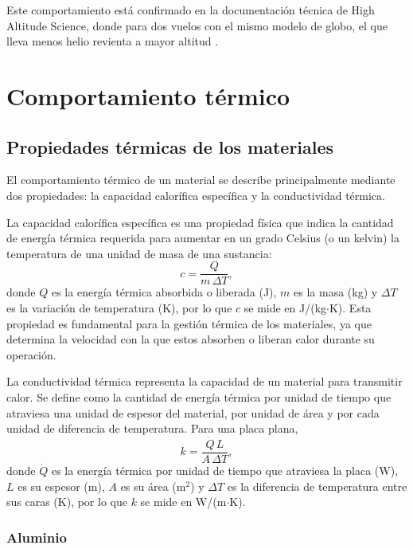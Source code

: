 \documentclass[12pt,a4paper]{article}
\begin{document}
Este comportamiento está confirmado en la documentación técnica de High Altitude Science, donde para dos vuelos con el mismo modelo de globo, el que lleva menos helio revienta a mayor altitud \cite{ref74}.

\newpage

\section{Comportamiento térmico}\label{materiales-termico}

\subsection{Propiedades térmicas de los materiales}\label{materiales}

El comportamiento térmico de un material se describe principalmente mediante dos propiedades: la capacidad calorífica específica y la conductividad térmica.

La capacidad calorífica específica es una propiedad física que indica la cantidad de energía térmica requerida para aumentar en un grado Celsius (o un kelvin) la temperatura de una unidad de masa de una sustancia:
\begin{equation}
  c = \frac{Q}{m \, \Delta T},
  \label{eq:calor-especifico}
\end{equation}
donde $Q$ es la energía térmica absorbida o liberada (J), $m$ es la masa (kg) y $\Delta T$ es la variación de temperatura (K), por lo que $c$ se mide en J/(kg$\cdot$K). Esta propiedad es fundamental para la gestión térmica de los materiales, ya que determina la velocidad con la que estos absorben o liberan calor durante su operación.

La conductividad térmica representa la capacidad de un material para transmitir calor. Se define como la cantidad de energía térmica por unidad de tiempo que atraviesa una unidad de espesor del material, por unidad de área y por cada unidad de diferencia de temperatura. Para una placa plana,
\begin{equation}
  k = \frac{\dot{Q} \, L}{A \, \Delta T},
  \label{eq:conductividad}
\end{equation}
donde $\dot{Q}$ es la energía térmica por unidad de tiempo que atraviesa la placa (W), $L$ es su espesor (m), $A$ es su área (m$^2$) y $\Delta T$ es la diferencia de temperatura entre sus caras (K), por lo que $k$ se mide en W/(m$\cdot$K).

\subsubsection{Aluminio}\label{aluminio}
\end{document}
